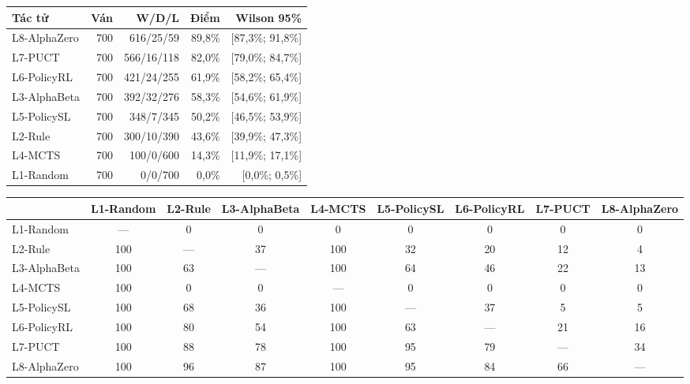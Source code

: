 \begin{center}\small
\begin{tabular}{@{}lrrrr@{}}
\toprule
Tác tử & Ván & W/D/L & Điểm & Wilson 95\% \\
\midrule
L8-AlphaZero & 700 & 616/25/59 & 89,8\% & [87,3\%; 91,8\%] \\
L7-PUCT & 700 & 566/16/118 & 82,0\% & [79,0\%; 84,7\%] \\
L6-PolicyRL & 700 & 421/24/255 & 61,9\% & [58,2\%; 65,4\%] \\
L3-AlphaBeta & 700 & 392/32/276 & 58,3\% & [54,6\%; 61,9\%] \\
L5-PolicySL & 700 & 348/7/345 & 50,2\% & [46,5\%; 53,9\%] \\
L2-Rule & 700 & 300/10/390 & 43,6\% & [39,9\%; 47,3\%] \\
L4-MCTS & 700 & 100/0/600 & 14,3\% & [11,9\%; 17,1\%] \\
L1-Random & 700 & 0/0/700 & 0,0\% & [0,0\%; 0,5\%] \\
\bottomrule
\end{tabular}
\end{center}
\begin{center}\scriptsize\setlength{\tabcolsep}{3pt}
\begin{tabular}{@{}lcccccccc@{}}
\toprule
 & L1-Random & L2-Rule & L3-AlphaBeta & L4-MCTS & L5-PolicySL & L6-PolicyRL & L7-PUCT & L8-AlphaZero \\
\midrule
L1-Random & — & 0 & 0 & 0 & 0 & 0 & 0 & 0 \\
L2-Rule & 100 & — & 37 & 100 & 32 & 20 & 12 & 4 \\
L3-AlphaBeta & 100 & 63 & — & 100 & 64 & 46 & 22 & 13 \\
L4-MCTS & 100 & 0 & 0 & — & 0 & 0 & 0 & 0 \\
L5-PolicySL & 100 & 68 & 36 & 100 & — & 37 & 5 & 5 \\
L6-PolicyRL & 100 & 80 & 54 & 100 & 63 & — & 21 & 16 \\
L7-PUCT & 100 & 88 & 78 & 100 & 95 & 79 & — & 34 \\
L8-AlphaZero & 100 & 96 & 87 & 100 & 95 & 84 & 66 & — \\
\bottomrule
\end{tabular}
\end{center}